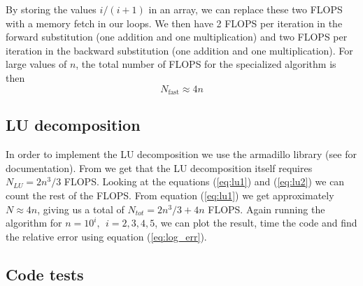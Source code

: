 \documentclass[reprint, english,notitlepage]{revtex4-1}  %
\begin{document}
By storing the values $i/(i+1)$ in an array, we can replace these two FLOPS with a memory fetch in our loops. We then have 2 FLOPS per iteration in the forward substitution (one addition and one multiplication) and two FLOPS per iteration in the backward substitution (one addition and one multiplication). For large values of $n$, the total number of FLOPS for the specialized algorithm is then
\begin{equation}
  \label{eq:flops_specialized}
  N_{\text{fast}} \approx 4n
\end{equation}


\subsection{LU decomposition}

In order to implement the LU decomposition we use the armadillo library (see \citep{armadillo} for documentation). From \citep{lu_wiki} we get that the LU decomposition itself requires $N_{LU} = 2n^3/3$ FLOPS. Looking at the equations (\ref{eq:lu1}) and (\ref{eq:lu2}) we can count the rest of the FLOPS. From equation (\ref{eq:lu1}) we get approximately $N \approx 4n$, giving us a total of $N_{tot} = 2n^3/3 + 4n$ FLOPS. Again running the algorithm for $n=10^i,\ \ i = 2, 3, 4, 5$, we can plot the result, time the code and find the relative error using equation (\ref{eq:log_err}).


\subsection{Code tests}
\end{document}
